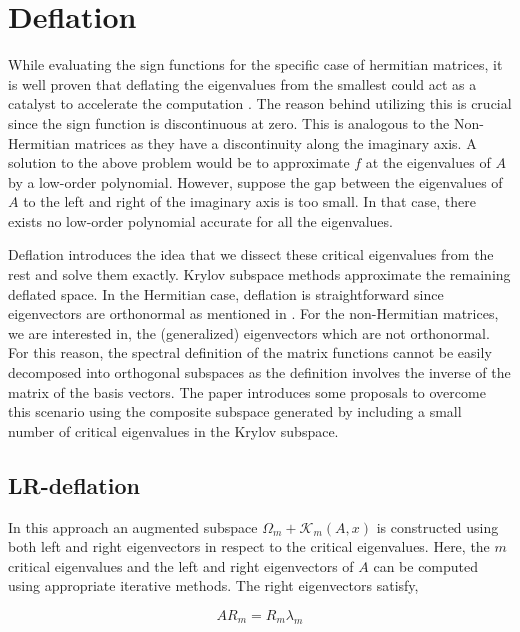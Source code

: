 \chapter{Deflation}
\label{sec:deflation}

While evaluating the sign functions for the specific case of hermitian matrices, it is well proven that deflating the eigenvalues from the smallest could act as a catalyst to accelerate the computation \cite{10}. The reason behind utilizing this is crucial since the sign function is discontinuous at zero. This is analogous to the Non-Hermitian matrices as they have a discontinuity along the imaginary axis. A solution to the above problem would be to approximate $f$ at the eigenvalues of $A$ by a low-order polynomial. However, suppose the gap between the eigenvalues of $A$ to the left and right of the imaginary axis is too small. In that case, there exists no low-order polynomial accurate for all the eigenvalues.

Deflation introduces the idea that we dissect these critical eigenvalues from the rest and solve them exactly. Krylov subspace methods approximate the remaining deflated space. In the Hermitian case, deflation is straightforward since eigenvectors are orthonormal as mentioned in \cite{11}. For the non-Hermitian matrices, we are interested in, the (generalized) eigenvectors which are not orthonormal. For this reason, the spectral definition of the matrix functions cannot be easily decomposed into orthogonal subspaces as the definition involves the inverse of the matrix of the basis vectors. The paper\cite{11} introduces some proposals to overcome this scenario using the composite subspace generated by including a small number of critical eigenvalues in the Krylov subspace.

\section{LR-deflation}
\label{sec:LR_def}

In this approach an augmented subspace $\Omega_{m} + \mathcal{K}_{m}(A, x)$ is constructed using both left and right eigenvectors in respect to the critical eigenvalues. Here, the $m$ critical eigenvalues and the left and right eigenvectors of $A$ can be computed using appropriate iterative methods. The right eigenvectors satisfy,

\begin{equation}
    AR_{m} = R_{m}\lambda_{m}
    \label{eq:2.57}
\end{equation}

